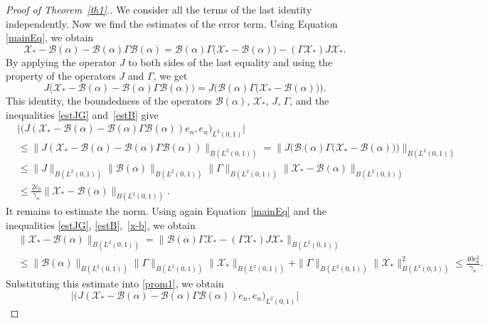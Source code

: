 \documentclass[11pt,centertags,reqno,twoside]{amsart}
\numberwithin{equation}{section}
\theoremstyle{definition}
\theoremstyle{remark}
\begin{document}
\begin{proof}[Proof of Theorem~\ref{th1}.]
We consider all the terms of the last identity independently. Now we find the estimates
of the error term. Using Equation \eqref{mainEq}, we obtain
\[
\mathcal{X}_*-\mathcal{B}(\alpha)-\mathcal{B}(\alpha)\Gamma\mathcal{B}(\alpha)
=\mathcal{B}(\alpha)\Gamma\big(\mathcal{X}_*-\mathcal{B}(\alpha)\big)
-(\Gamma\mathcal{X}_*)J\mathcal{X}_*.
\]
By applying the operator $J$ to both sides of the last equality and using the property
of the operators $J$ and $\Gamma$, we get
\[
J\big(\mathcal{X}_*-\mathcal{B}(\alpha)-\mathcal{B}(\alpha)\Gamma\mathcal{B}(\alpha)\big)=
J\Big(\mathcal{B}(\alpha)\Gamma\big(\mathcal{X}_*-\mathcal{B}(\alpha)\big)\Big).
\]
This identity, the boundedness of the operators $\mathcal{B}(\alpha)$, $\mathcal{X}_*$,
$J$, $\Gamma$, and the inequalities \eqref{estJG} and~\eqref{estB} give
\begin{equation}\label{prom1}
\begin{aligned}
&\Big|\big(J(\mathcal{X}_*-\mathcal{B}(\alpha)
-\mathcal{B}(\alpha)\Gamma\mathcal{B}(\alpha))e_n, e_n\big)_{L^2(0, 1)}\Big|\\
&\leqslant\|J(\mathcal{X}_*-\mathcal{B}(\alpha)
-\mathcal{B}(\alpha)\Gamma\mathcal{B}(\alpha))\|_{B(L^2(0, 1))}
=\|J\big(\mathcal{B}(\alpha)\Gamma\big(\mathcal{X}_*
-\mathcal{B}(\alpha)\big)\big)\|_{B(L^2(0, 1))} \\
&\leqslant \|J\|_{B(L^2(0, 1))}\|\mathcal{B}(\alpha)\|_{B(L^2(0, 1))}
\|\Gamma\|_{B(L^2(0, 1))}\|\mathcal{X}_*-\mathcal{B}(\alpha)\|_{B(L^2(0, 1))} \\
&\leqslant \frac{2c_0}{\gamma_n}\|\mathcal{X}_*-\mathcal{B}(\alpha)\|_{B(L^2(0, 1))}.
\end{aligned}
\end{equation}
It remains to estimate the norm. Using again Equation~\eqref{mainEq} and
the inequalities \eqref{estJG}, \eqref{estB},~\eqref{x-b}, we obtain
\begin{align*}
&\|\mathcal{X}_*-\mathcal{B}(\alpha)\|_{B(L^2(0, 1))} =
\|\mathcal{B}(\alpha)\Gamma\mathcal{X}_*
-(\Gamma\mathcal{X}_*)J\mathcal{X}_*\|_{B(L^2(0, 1))} \\
&\leqslant \|\mathcal{B}(\alpha)\|_{B(L^2(0, 1))}\|\Gamma\|_{B(L^2(0, 1))}
\|\mathcal{X}_*\|_{B(L^2(0, 1))}+\|\Gamma\|_{B(L^2(0, 1))}
\|\mathcal{X}_*\|_{B(L^2(0, 1))}^2\leqslant \frac{40c_0^2}{\gamma_n}.
\end{align*}
Substituting this estimate into \eqref{prom1}, we obtain
\begin{equation}\label{error}
\Big|\big(J(\mathcal{X}_*-\mathcal{B}(\alpha)
-\mathcal{B}(\alpha)\Gamma\mathcal{B}(\alpha))e_n, e_n\big)_{L^2(0, 1)}\Big|

\end{equation}
\end{proof}
\end{document}
